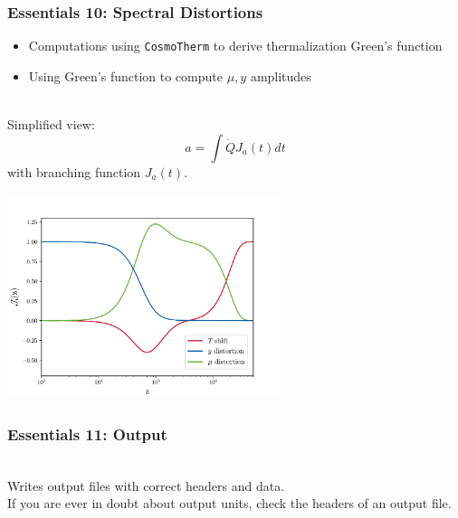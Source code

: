 \begin{frame}[fragile]
	\frametitle{Essentials 10: Spectral Distortions}

	\begin{itemize}
		\item
		Computations using \texttt{CosmoTherm} to derive thermalization Green's function
		\item Using Green's function to compute $\mu,y$ amplitudes
	\end{itemize}

	\mbox{}\\
	Simplified view:
	\begin{equation}
		a = \int \dot{Q} J_a(t) dt
	\end{equation}
	with branching function $J_a(t)$.\\[1ex]

	\begin{center}
	\includegraphics[width=0.6\textwidth]{Figures/br_pca_edited.pdf}
	\end{center}
	
\end{frame}




\begin{frame}[fragile]
	\frametitle{Essentials 11: Output}
	\mbox{}\\
	Writes output files with correct headers and data.\\
	If you are ever in doubt about \CLASS{} output units, check the headers of an output file.
\end{frame}



